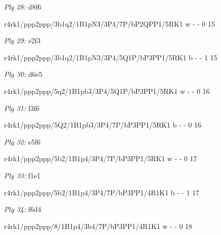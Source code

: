 \documentclass{article}
\begin{document}
\showboard

\bigskip

\emph{Ply 28:} d8f6

r4rk1/ppp2ppp/3b1q2/1B1pN3/3P4/7P/bP2QPP1/5RK1 w - - 0 15


\showboard

\bigskip

\emph{Ply 29:} e2f3


r4rk1/ppp2ppp/3b1q2/1B1pN3/3P4/5Q1P/bP3PP1/5RK1 b - - 1 15


\showboard

\bigskip

\emph{Ply 30:} d6e5

r4rk1/ppp2ppp/5q2/1B1pb3/3P4/5Q1P/bP3PP1/5RK1 w - - 0 16


\showboard

\bigskip

\emph{Ply 31:} f3f6


r4rk1/ppp2ppp/5Q2/1B1pb3/3P4/7P/bP3PP1/5RK1 b - - 0 16


\showboard

\bigskip

\emph{Ply 32:} e5f6

r4rk1/ppp2ppp/5b2/1B1p4/3P4/7P/bP3PP1/5RK1 w - - 0 17


\showboard

\bigskip

\emph{Ply 33:} f1e1


r4rk1/ppp2ppp/5b2/1B1p4/3P4/7P/bP3PP1/4R1K1 b - - 1 17


\showboard

\bigskip

\emph{Ply 34:} f6d4

r4rk1/ppp2ppp/8/1B1p4/3b4/7P/bP3PP1/4R1K1 w - - 0 18


\showboard
\end{document}
